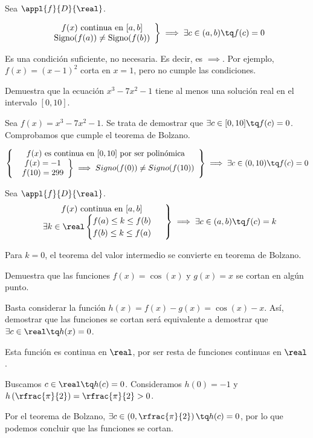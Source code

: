 \begin{theorem}
Sea $\appl{f}{D}{\real}$.

\[
\left.\begin{array}{c}f(x) \text{ continua en } [a,b]\\\text{Signo}(f(a))\neq \text{Signo}(f(b))\end{array}\right\}\implies \exists c\in(a,b) \tq f(c) = 0
\]

\obs Es una condición suficiente, no necesaria. Es decir, es $\implies $. Por ejemplo, $f(x) = (x-1)^2$ corta en $x=1$, pero no cumple las condiciones.
\end{theorem}

\begin{problem} Demuestra que la ecuación $x^3-7x^2-1$ tiene al menos una solución real en el intervalo $[0,10]$.
\solution

Sea $f(x) = x^3-7x^2-1$. Se trata de demostrar que $\exists c\in[0,10]\tq f(c) = 0$. Comprobamos que cumple el teorema de Bolzano.

\[
\left\{
	\begin{array}{c}
		f(x) \text{ es continua en } [0,10] \text{ por ser polinómica}\\
		\left.\begin{array}{c}
		f(x) = -1 \\
		f(10) = 299\end{array}
		\right\}\implies Signo(f(0))\neq Signo(f(10))
	\end{array}
\right\}\implies \exists c\in(0,10)\tq f(c)=0 
\]
\end{problem}

\begin{theorem}
Sea $\appl{f}{D}{\real}$.
\[
\left.\begin{array}{c}f(x) \text{ continua en } [a,b]\\
\exists k\in\real \begin{cases}f(a)\leq k\leq f(b)\\f(b)\leq k \leq f(a)\end{cases}\end{array}\right\}\implies \exists c\in(a,b) \tq f(c) = k
\]
\end{theorem}

\obs Para $k=0$, el teorema del valor intermedio se convierte en teorema de Bolzano.


\begin{problem}
Demuestra que las funciones $f(x) = \cos(x)$ y $g(x) = x$ se cortan en algún punto.
\solution

Basta considerar la función $h(x) = f(x) - g(x) = \cos(x)-x$. Así, demostrar que las funciones se cortan será equivalente a demostrar que $\exists c\in\real\tq h(x)=0$. 

Esta función es continua en $\real$, por ser resta de funciones continuas en $\real$.

Buscamos $c\in\real\tq h(c)=0$. Consideramos $h(0) = -1$ y $h\left(\rfrac{\pi}{2}\right) = \rfrac{\pi}{2}>0$.

Por el teorema de Bolzano, $\exists c\in\left(0,\rfrac{\pi}{2}\right)\tq h(c) = 0$, por lo que podemos concluir que las funciones se cortan.
\end{problem}

